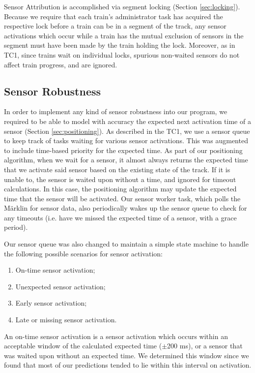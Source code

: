 \documentclass[12pt, titlepage]{article}
\begin{document}
    Sensor Attribution is accomplished via segment locking (Section \ref{sec:locking}). Because we require that each train's administrator task has acquired the respective lock before a train can be in a segment of the track, any sensor activations which occur while a train has the mutual exclusion of sensors in the segment must have been made by the train holding the lock. Moreover, as in TC1, since trains wait on individual locks, spurious non-waited sensors do not affect train progress, and are ignored.
    
    \subsection{Sensor Robustness}
    \label{sec:sensor-robustness}
    
    In order to implement any kind of sensor robustness into our program, we required to be able to model with accuracy the expected next activation time of a sensor (Section \ref{sec:positioning}). As described in the TC1, we use a sensor queue to keep track of tasks waiting for various sensor activations. This was augmented to include time-based priority for the expected time. As part of our positioning algorithm, when we wait for a sensor, it almost always returns the expected time that we activate said sensor based on the existing state of the track. If it is unable to, the sensor is waited upon without a time, and ignored for timeout calculations. In this case, the positioning algorithm may update the expected time that the sensor will be activated. Our sensor worker task, which polls the Märklin for sensor data, also periodically wakes up the sensor queue to check for any timeouts (i.e. have we missed the expected time of a sensor, with a grace period).

    Our sensor queue was also changed to maintain a simple state machine to handle the following possible scenarios for sensor activation:
    \begin{enumerate}
        \item On-time sensor activation;
        \item Unexpected sensor activation;
        \item Early sensor activation;
        \item Late or missing sensor activation.
    \end{enumerate}
    
    An on-time sensor activation is a sensor activation which occurs within an acceptable window of the calculated expected time ($\pm$200 ms), or a sensor that was waited upon without an expected time. We determined this window since we found that most of our predictions tended to lie within this interval on activation.
    
\end{document}
